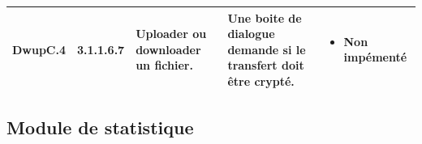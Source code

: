 \documentclass[10pt,a4paper,landscape]{report}
\begin{document}
\begin{center}
\begin{tabular}{|p{2.5cm}|p{2cm}|p{8cm}|p{8cm}|p{5cm}|}
 \\
		\hline
		DwupC.4 & 3.1.1.6.7 & Uploader ou downloader un fichier. & Une boite de dialogue demande si le transfert doit être crypté. & \vspace*{-0.2cm} \begin{itemize}[label=$\ast$] \item \textcolor{false}{Non impémenté}\end{itemize}
\\		
		\hline	
	\end{tabular}
	\egroup
\end{center}

\subsection{Module de statistique}
\end{document}
